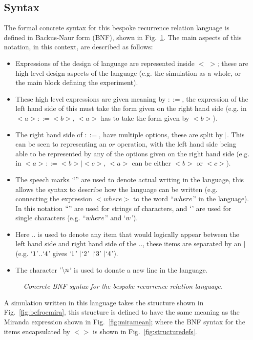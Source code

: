 \documentclass{article}
\begin{document}
\subsection{Syntax}
The formal concrete syntax for this bespoke recurrence relation language is defined in Backus-Naur form (BNF), shown in Fig.~\ref{fig:bnflex}. The main aspects of this notation, in this context, are described as follows:
\begin{itemize}
  \item Expressions of the design of language are represented inside $<$ $>$; these are high level design aspects of the language (e.g. the simulation as a whole, or the main block defining the experiment).
  \item These high level expressions are given meaning by $::=$, the expression of the left hand side of this must take the form given on the right hand side (e.g. in $<a> ::= <b>$, $<a>$ has to take the form given by $<b>$).  
  \item The right hand side of $::=$, have multiple options, these are split by $|$. This can be seen to representing an $or$ operation, with the left hand side being able to be represented by any of the options given on the right hand side (e.g. in $<a> ::= <b> | <c>$, $<a>$ can be either $<b>$ or $<c>$). 
  \item The speech marks $``$'' are used to denote actual writing in the language, this allows the syntax to describe how the language can be written (e.g. connecting the expression $<where>$ to the word $``where$'' in the language). In this notation $``$'' are used for strings of characters, and $`$' are used for single characters (e.g. $``where$'' and $`w$').
  \item Here $..$ is used to denote any item that would logically appear between the left hand side and right hand side of the $..$, these items are separated by an $|$ (e.g. $`1$'$.. `4$' gives $`1$' $| `2$' $| `3$' $| `4$'). 
  \item The character $`\backslash n$' is used to donate  a new line in the language. 
\end{itemize}
\begin{figure}[H]
	\centering
	
	\caption{\it Concrete BNF syntax for the bespoke recurrence relation language.}
	\label{fig:bnflex}
\end{figure} 

A simulation written in this language takes the structure shown in Fig.~\ref{fig:befroemira}, this structure is defined to have the same meaning as the Miranda expression shown in Fig.~\ref{fig:miramean}; where the BNF syntax for the items encapsulated by $<>$ is shown in Fig.~\ref{fig:structuredefs}.
\end{document}

